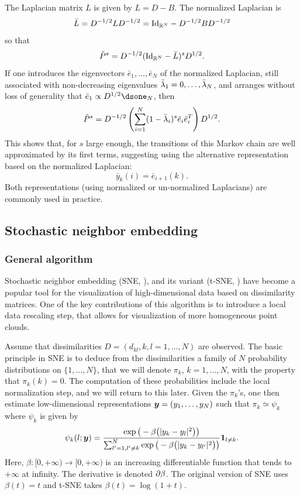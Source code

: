 The Laplacian matrix $L$ is given by $L = D-B$. The normalized Laplacian is 
\[
\bar L = D^{-1/2} L D^{-1/2} = \Id[N] - D^{-1/2} B D^{-1/2}
\]
so that
\[
\tilde P^s = D^{-1/2} (\Id[N] - \bar L)^s D^{1/2}.
\]
If one introduces the eigenvectors $\bar e_1, \ldots, \bar e_N$ of the normalized Laplacian, still associated with non-decreasing eigenvalues $\bar{\lambda}_1=0, \ldots, \bar{\lambda}_N$, and arranges without loss of generality that $\bar e_1 \propto D^{1/2} \dsone_N$, then 
\[
\tilde P^s = D^{-1/2} \left(\sum_{i=1}^N (1 - \bar {\lambda}_i)^s \bar e_i\bar e_i^T\right) D^{1/2}.
\]
This shows that, for $s$ large enough, the transitions of this Markov chain are well approximated by its first terms, suggesting using the alternative representation based on the normalized Laplacian:
\[
\bar y_k(i) = \bar e_{i+1}(k).
\]
Both representations (using normalized or un-normalized Laplacians) are commonly used in practice.

 

\subsection{Stochastic neighbor embedding}

\subsubsection{General algorithm}
Stochastic neighbor embedding (SNE, \citet{hinton2002stochastic}), and its variant (t-SNE, \citet{maaten2008visualizing}) have become a popular tool for the visualization of high-dimensional data based on dissimilarity matrices. One of the key contributions of this algorithm is to introduce a local data rescaling step, that allows for visualization of more homogeneous point clouds. 

Assume that dissimilarities $D = (d_{kl}, k,l=1, \ldots, N)$ are observed. The basic principle in SNE is to deduce from the dissimilarities a family of $N$ probability distributions on $\{1, \ldots, N\}$, that we will denote $\pi_k$, $k=1, \ldots, N$, with the property that $\pi_k(k) = 0$. The computation of these probabilities include the local normalization step, and we will return to this later. Given the $\pi_k$'s, one then estimate low-dimensional representations ${\bm{y}} = (y_1, \ldots, y_N)$ such that $\pi_k \simeq \psi_k$ where $\psi_k$ is given by
\[
\psi_k(l;{\bm{y}}) = \frac{\exp\big(-\beta\big(|y_k-y_l|^2\big)\big)}{\sum_{l'=1, l'\neq k}^N \exp\big(-\beta\big(|y_k-y_{l'}|^2\big)\big)} {\bm 1}_{l\neq k}.
\] 
Here, $\beta: [0, +\infty) \to [0, +\infty)$ is an increasing differentiable function that tends to $+\infty$ at infinity. The  derivative is denoted $\partial\beta$. The original version of SNE \citep{hinton2002stochastic} uses $\beta(t) = t$ and t-SNE \citep{maaten2008visualizing} takes $\beta(t) = \log(1+t)$.  

